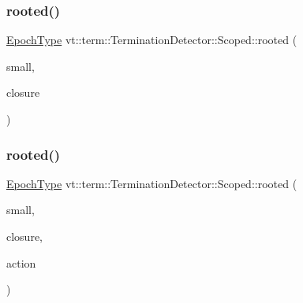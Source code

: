 \mbox{\label{structvt_1_1term_1_1_termination_detector_1_1_scoped_a196ceebfdcc0b2782823a3239fd970bd}} 
\subsubsection{\texorpdfstring{rooted()}{rooted()}\hspace{0.1cm}{\footnotesize\ttfamily [1/2]}}
{\footnotesize\ttfamily \hyperlink{namespacevt_a985a5adf291c34a3ca263b3378388236}{Epoch\+Type} vt\+::term\+::\+Termination\+Detector\+::\+Scoped\+::rooted (\begin{DoxyParamCaption}\item[{bool}]{small,  }\item[{\hyperlink{namespacevt_ae0a5a7b18cc99d7b732cb4d44f46b0f3}{Action\+Type}}]{closure }\end{DoxyParamCaption})\hspace{0.3cm}{\ttfamily [static]}}

\mbox{\label{structvt_1_1term_1_1_termination_detector_1_1_scoped_a92cf8ce8367c98777475ab9d290d1572}} 
\subsubsection{\texorpdfstring{rooted()}{rooted()}\hspace{0.1cm}{\footnotesize\ttfamily [2/2]}}
{\footnotesize\ttfamily \hyperlink{namespacevt_a985a5adf291c34a3ca263b3378388236}{Epoch\+Type} vt\+::term\+::\+Termination\+Detector\+::\+Scoped\+::rooted (\begin{DoxyParamCaption}\item[{bool}]{small,  }\item[{\hyperlink{namespacevt_ae0a5a7b18cc99d7b732cb4d44f46b0f3}{Action\+Type}}]{closure,  }\item[{\hyperlink{namespacevt_ae0a5a7b18cc99d7b732cb4d44f46b0f3}{Action\+Type}}]{action }\end{DoxyParamCaption})\hspace{0.3cm}{\ttfamily [static]}}

